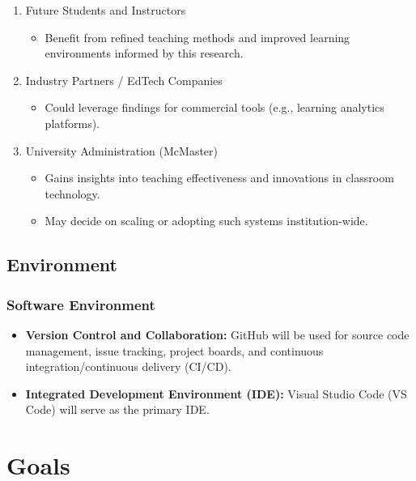 \documentclass{article}
\begin{document}
\begin{enumerate}
    \item Future Students and Instructors
    \begin{itemize}
        \item Benefit from refined teaching methods and improved learning environments informed by this research.
    \end{itemize}

    \item Industry Partners / EdTech Companies
    \begin{itemize}
        \item Could leverage findings for commercial tools (e.g., learning analytics platforms).
    \end{itemize}

    \item University Administration (McMaster)
    \begin{itemize}
        \item Gains insights into teaching effectiveness and innovations in classroom technology.
        \item May decide on scaling or adopting such systems institution-wide.
    \end{itemize}
\end{enumerate}

\subsection{Environment}

\subsubsection*{Software Environment}

\begin{itemize}
    \item \textbf{Version Control and Collaboration:} GitHub will be used for source code management, issue tracking, project boards, and continuous integration/continuous delivery (CI/CD).
    \item \textbf{Integrated Development Environment (IDE):} Visual Studio Code (VS Code) will serve as the primary IDE.
\end{itemize}

\section{Goals}
\end{document}

